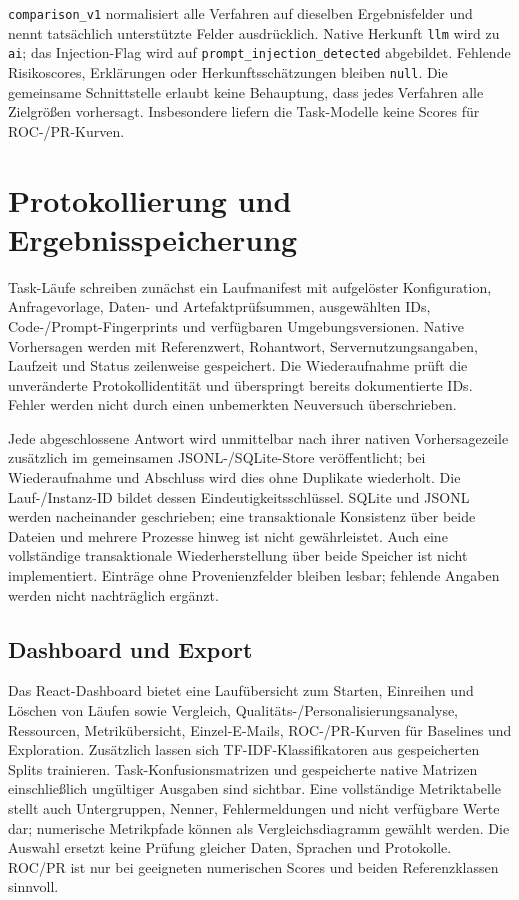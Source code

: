 \documentclass[12pt,twoside=false,a4paper,parskip]{scrbook}
\begin{document}
\texttt{comparison\_v1} normalisiert alle Verfahren auf dieselben Ergebnisfelder und nennt tatsächlich unterstützte Felder ausdrücklich. Native Herkunft \texttt{llm} wird zu \texttt{ai}; das Injection-Flag wird auf \texttt{prompt\_injection\_detected} abgebildet. Fehlende Risikoscores, Erklärungen oder Herkunftsschätzungen bleiben \texttt{null}. Die gemeinsame Schnittstelle erlaubt keine Behauptung, dass jedes Verfahren alle Zielgrößen vorhersagt. Insbesondere liefern die Task-Modelle keine Scores für ROC-/PR-Kurven.

\section{Protokollierung und Ergebnisspeicherung}\label{sec:logging}

Task-Läufe schreiben zunächst ein Laufmanifest mit aufgelöster Konfiguration, Anfragevorlage, Daten- und Artefaktprüfsummen, ausgewählten IDs, Code-/Prompt-Fingerprints und verfügbaren Umgebungsversionen. Native Vorhersagen werden mit Referenzwert, Rohantwort, Servernutzungsangaben, Laufzeit und Status zeilenweise gespeichert. Die Wiederaufnahme prüft die unveränderte Protokollidentität und überspringt bereits dokumentierte IDs. Fehler werden nicht durch einen unbemerkten Neuversuch überschrieben.

Jede abgeschlossene Antwort wird unmittelbar nach ihrer nativen Vorhersagezeile zusätzlich im gemeinsamen JSONL-/SQLite-Store veröffentlicht; bei Wiederaufnahme und Abschluss wird dies ohne Duplikate wiederholt. Die Lauf-/Instanz-ID bildet dessen Eindeutigkeitsschlüssel. SQLite und JSONL werden nacheinander geschrieben; eine transaktionale Konsistenz über beide Dateien und mehrere Prozesse hinweg ist nicht gewährleistet. Auch eine vollständige transaktionale Wiederherstellung über beide Speicher ist nicht implementiert. Einträge ohne Provenienzfelder bleiben lesbar; fehlende Angaben werden nicht nachträglich ergänzt.

\subsection{Dashboard und Export}

Das React-Dashboard bietet eine Laufübersicht zum Starten, Einreihen und Löschen von Läufen sowie Vergleich, Qualitäts-/Personalisierungsanalyse, Ressourcen, Metrikübersicht, Einzel-E-Mails, ROC-/PR-Kurven für Baselines und Exploration. Zusätzlich lassen sich TF-IDF-Klassifikatoren aus gespeicherten Splits trainieren. Task-Konfusionsmatrizen und gespeicherte native Matrizen einschließlich ungültiger Ausgaben sind sichtbar. Eine vollständige Metriktabelle stellt auch Untergruppen, Nenner, Fehlermeldungen und nicht verfügbare Werte dar; numerische Metrikpfade können als Vergleichsdiagramm gewählt werden. Die Auswahl ersetzt keine Prüfung gleicher Daten, Sprachen und Protokolle. ROC/PR ist nur bei geeigneten numerischen Scores und beiden Referenzklassen sinnvoll.
\end{document}
